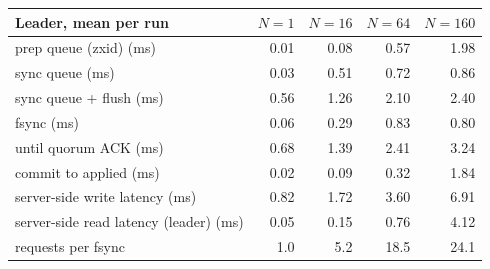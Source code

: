 \begin{tabular}{@{}lrrrr@{}}
\toprule
Leader, mean per run & $N=1$ & $N=16$ & $N=64$ & $N=160$ \\
\midrule
prep queue (zxid) (ms) & 0.01 & 0.08 & 0.57 & 1.98 \\
sync queue (ms) & 0.03 & 0.51 & 0.72 & 0.86 \\
sync queue + flush (ms) & 0.56 & 1.26 & 2.10 & 2.40 \\
fsync (ms) & 0.06 & 0.29 & 0.83 & 0.80 \\
until quorum ACK (ms) & 0.68 & 1.39 & 2.41 & 3.24 \\
commit to applied (ms) & 0.02 & 0.09 & 0.32 & 1.84 \\
server-side write latency (ms) & 0.82 & 1.72 & 3.60 & 6.91 \\
server-side read latency (leader) (ms) & 0.05 & 0.15 & 0.76 & 4.12 \\
requests per fsync & 1.0 & 5.2 & 18.5 & 24.1 \\
\bottomrule
\end{tabular}

